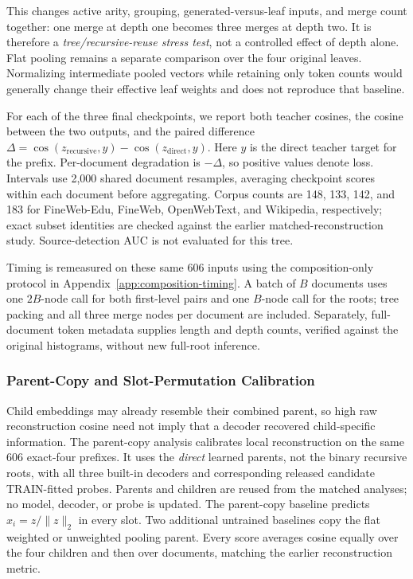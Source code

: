 \documentclass[10pt]{article}
\begin{document}
This changes active arity, grouping, generated-versus-leaf inputs, and merge
count together: one merge at depth one becomes three merges at depth two.
It is therefore a \emph{tree/recursive-reuse stress test}, not a controlled
effect of depth alone. Flat pooling remains a separate comparison over the four
original leaves. Normalizing intermediate pooled vectors while retaining only
token counts would generally change their effective leaf weights and does not
reproduce that baseline.

For each of the three final checkpoints, we report both teacher cosines, the
cosine between the two outputs, and the paired difference
\(\Delta=\cos(z_{\mathrm{recursive}},y)-\cos(z_{\mathrm{direct}},y)\).
Here \(y\) is the direct teacher target for the prefix. Per-document degradation
is \(-\Delta\), so positive values denote loss.
Intervals use 2,000 shared document resamples, averaging checkpoint scores
within each document before aggregating. Corpus counts are 148, 133, 142, and
183 for FineWeb-Edu, FineWeb, OpenWebText, and Wikipedia, respectively; exact
subset identities are checked against the earlier matched-reconstruction study.
Source-detection AUC is not evaluated for this tree.

Timing is remeasured on these same 606 inputs using the composition-only
protocol in Appendix~\ref{app:composition-timing}. A batch of \(B\) documents
uses one \(2B\)-node call for both first-level pairs and one \(B\)-node call for
the roots; tree packing and all three merge nodes per document are included.
Separately, full-document token metadata supplies length and depth counts,
verified against the original histograms, without new full-root inference.

\subsubsection{Parent-Copy and Slot-Permutation Calibration}
\label{sec:reconstruction-calibration-protocol}

Child embeddings may already resemble their combined parent, so high raw
reconstruction cosine need not imply that a decoder recovered child-specific
information. The parent-copy analysis calibrates local reconstruction on the
same 606 exact-four prefixes. It uses the \emph{direct} learned parents, not
the binary recursive roots, with all three built-in decoders and corresponding
released candidate TRAIN-fitted probes. Parents and children are reused from
the matched analyses; no model, decoder, or probe is updated. The parent-copy
baseline predicts \(\hat{x}_i=z/\lVert z\rVert_2\) in every slot. Two additional
untrained baselines copy the flat weighted or unweighted pooling parent.
Every score averages cosine equally over the four children and then over
documents, matching the earlier reconstruction metric.
\end{document}
